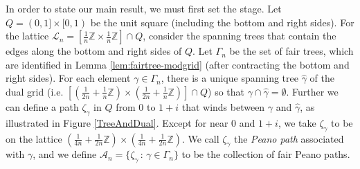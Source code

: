 \documentclass[preprint,12pt]{elsarticle}
\theoremstyle{definition}
\theoremstyle{remark}
\numberwithin{equation}{section}
\begin{document}
In order to state our main result, we must first set the stage.
Let $Q=(0,1] \times [0,1)$ be the unit square (including the bottom and right sides).  
For the lattice $\mathcal{L}_n =  \left[\frac{1}{n}\mathbb{Z} \times \frac{1}{n}\mathbb{Z}\right] \cap Q$,
consider the spanning trees that contain the edges along the bottom and right sides of $Q$.
Let $\Gamma_n$ be the set of fair trees, which are identified in Lemma \ref{lem:fairtree-modgrid} (after contracting the bottom and right sides). 
For each element $\gamma \in \Gamma_n$,
there is a unique spanning tree $\hat{\gamma}$ of the dual grid (i.e. $ \left[(\frac{1}{2n}+\frac{1}{n}\mathbb{Z}) \times (\frac{1}{2n}+ \frac{1}{n}\mathbb{Z})\right] \cap Q$) so that $\gamma \cap \hat{\gamma} = \emptyset$.
Further we can define a path $\zeta_\gamma$ in $Q$ from 0 to $1+i$ that winds between $\gamma$ and $\hat{\gamma}$, as illustrated in Figure \ref{TreeAndDual}.  
Except for near 0 and $1+i$, we take $\zeta_\gamma$ to be on the lattice $ (\frac{1}{4n} + \frac{1}{2n}\mathbb{Z}) \times (\frac{1}{4n} +\frac{1}{2n}\mathbb{Z})$.
We call $\zeta_\gamma$ the {\it Peano path} associated with $\gamma$, 
and we define $\mathcal{A}_n = \{ \zeta_\gamma \, : \, \gamma \in \Gamma_n \}$
to be the collection of fair Peano paths.
\end{document}
